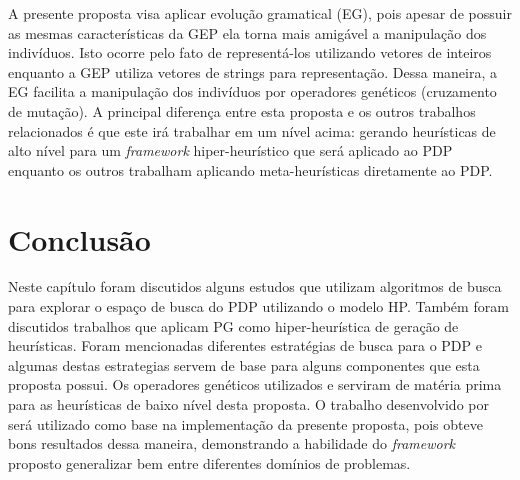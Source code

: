 A presente proposta visa aplicar evolução gramatical (EG), pois apesar de possuir as mesmas características da GEP ela torna mais amigável a manipulação dos indivíduos. Isto ocorre pelo fato de representá-los utilizando vetores de inteiros enquanto a GEP utiliza vetores de strings para representação. Dessa maneira, a EG facilita a manipulação dos indivíduos por operadores genéticos (cruzamento de mutação). A principal diferença entre esta proposta e os outros trabalhos relacionados \cite{santana2008protein,shmygelska2002ant,shmygelska2003improved,hsu2003growth, krasnogor2002multimeme,krasnogor2002multimeme,unger1993genetic} é que este irá trabalhar em um nível acima: gerando heurísticas de alto nível para um \textit{framework} hiper-heurístico que será aplicado ao PDP enquanto os outros trabalham aplicando meta-heurísticas diretamente ao PDP. 





\section{Conclusão}
\label{TrabalhosRelacionados:Conclusão}

Neste capítulo foram discutidos alguns estudos que utilizam algoritmos de busca para explorar o espaço de busca do PDP utilizando o modelo HP. Também foram discutidos trabalhos que aplicam PG como hiper-heurística de geração de heurísticas. Foram mencionadas diferentes estratégias de busca para o PDP e algumas destas estrategias servem de base para alguns componentes que esta proposta possui. Os operadores genéticos utilizados \cite{custodio2014multiple} e \cite{lin2011protein} serviram de matéria prima para as heurísticas de baixo nível desta proposta. O trabalho desenvolvido por \cite{sabar2015automatic} será utilizado como base na implementação da presente proposta, pois obteve bons resultados dessa maneira, demonstrando a habilidade do \textit{framework} proposto generalizar bem entre diferentes domínios de problemas.